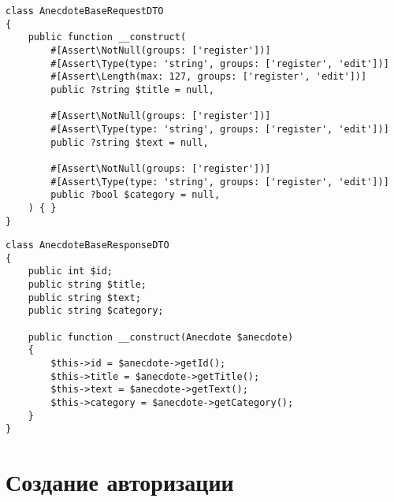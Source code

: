 \documentclass[pract]{SCWorks}
\begin{document}
\begin{verbatim}
class AnecdoteBaseRequestDTO
{
    public function __construct(
        #[Assert\NotNull(groups: ['register'])]
        #[Assert\Type(type: 'string', groups: ['register', 'edit'])]
        #[Assert\Length(max: 127, groups: ['register', 'edit'])]
        public ?string $title = null,

        #[Assert\NotNull(groups: ['register'])]
        #[Assert\Type(type: 'string', groups: ['register', 'edit'])]
        public ?string $text = null,

        #[Assert\NotNull(groups: ['register'])]
        #[Assert\Type(type: 'string', groups: ['register', 'edit'])]
        public ?bool $category = null,
    ) { }
}
\end{verbatim}

\begin{verbatim}
class AnecdoteBaseResponseDTO
{
    public int $id;
    public string $title;
    public string $text;
    public string $category;

    public function __construct(Anecdote $anecdote)
    {
        $this->id = $anecdote->getId();
        $this->title = $anecdote->getTitle();
        $this->text = $anecdote->getText();
        $this->category = $anecdote->getCategory();
    }
}
\end{verbatim}

\section{Создание авторизации}
\label{appendB}
\end{document}
